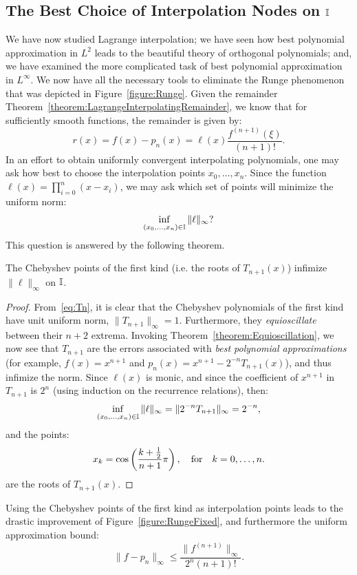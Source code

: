 \subsection{The Best Choice of Interpolation Nodes on $\mathbb{I}$}\label{subsection:ChebyshevPointsAreTheBest}

We have now studied Lagrange interpolation; we have seen how best polynomial approximation in $L^2$ leads to the beautiful theory of orthogonal polynomials; and, we have examined the more complicated task of best polynomial approximation in $L^\infty$. We now have all the necessary tools to eliminate the Runge phenomenon that was depicted in Figure~\ref{figure:Runge}. Given the remainder Theorem~\ref{theorem:LagrangeInterpolatingRemainder}, we know that for sufficiently smooth functions, the remainder is given by:
\[
r(x) = f(x)-p_n(x) = \ell(x)\dfrac{f^{(n+1)}(\xi)}{(n+1)!}.
\]
In an effort to obtain uniformly convergent interpolating polynomials, one may ask how best to choose the interpolation points $x_0,\ldots,x_n$. Since the function $\ell(x) = \prod_{i=0}^n(x-x_i)$, we may ask which set of points will minimize the uniform norm:
\[
\inf_{(x_0,\ldots,x_n)\in\mathbb{I}}\|\ell\|_\infty?
\]
This question is answered by the following theorem.
\begin{theorem}
The Chebyshev points of the first kind (i.e. the roots of $T_{n+1}(x)$) infimize $\|\ell\|_\infty$ on $\mathbb{I}$.
\end{theorem}
\begin{proof}
From~\eqref{eq:Tn}, it is clear that the Chebyshev polynomials of the first kind have unit uniform norm, $\|T_{n+1}\|_\infty = 1$. Furthermore, they {\em equioscillate} between their $n+2$ extrema. Invoking Theorem~\ref{theorem:Equioscillation}, we now see that $T_{n+1}$ are the errors associated with {\em best polynomial approximations} (for example, $f(x) = x^{n+1}$ and $p_n(x) = x^{n+1}-2^{-n}T_{n+1}(x)$), and thus infimize the norm. Since $\ell(x)$ is monic, and since the coefficient of $x^{n+1}$ in $T_{n+1}$ is $2^n$ (using induction on the recurrence relations), then:
\[
\inf_{(x_0,\ldots,x_n)\in\mathbb{I}}\|\ell\|_\infty = \|2^{-n}T_{n+1}\|_\infty = 2^{-n},
\]
and the points:
\[
x_k = \cos\left(\dfrac{k+\frac{1}{2}}{n+1}\pi\right),\quad{\rm for}\quad k=0,\ldots,n.
\]
are the roots of $T_{n+1}(x)$.
\end{proof}
Using the Chebyshev points of the first kind as interpolation points leads to the drastic improvement of Figure~\ref{figure:RungeFixed}, and furthermore the uniform approximation bound:
\[
\|f-p_n\|_\infty \le \dfrac{\|f^{(n+1)}\|_\infty}{2^{n}(n+1)!}.
\]

